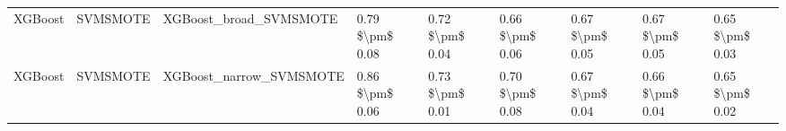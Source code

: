 \begin{tabular}{lllllllll}
                        XGBoost &                      SVMSMOTE &                       XGBoost\_broad\_SVMSMOTE & 0.79 \$\textbackslash pm\$ 0.08 &           0.72 \$\textbackslash pm\$ 0.04 &       0.66 \$\textbackslash pm\$ 0.06 &        0.67 \$\textbackslash pm\$ 0.05 &                         0.67 \$\textbackslash pm\$ 0.05 & 0.65 \$\textbackslash pm\$ 0.03 \\
                        XGBoost &                      SVMSMOTE &                      XGBoost\_narrow\_SVMSMOTE & 0.86 \$\textbackslash pm\$ 0.06 &           0.73 \$\textbackslash pm\$ 0.01 &       0.70 \$\textbackslash pm\$ 0.08 &        0.67 \$\textbackslash pm\$ 0.04 &                         0.66 \$\textbackslash pm\$ 0.04 & 0.65 \$\textbackslash pm\$ 0.02 \\
\bottomrule
\end{tabular}
